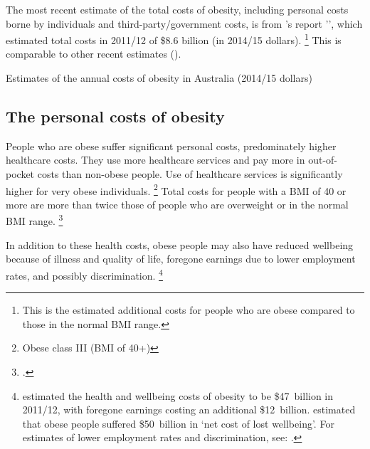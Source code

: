 \documentclass[embargoed]{grattan}
\begin{document}
The most recent estimate of the total costs of obesity, including personal costs borne by individuals and third-party/government costs, is from \citeauthor{PwC2015Weighingcostobesity}'s \citeyear{PwC2015Weighingcostobesity} report  '',
which estimated total costs in 2011/12 of \$8.6 billion (in 2014/15 dollars).%
\footnote{This is the estimated additional costs for people who are obese compared to those in the normal BMI range.} 
This is comparable to other recent estimates ().

\begin{table}
\caption{Estimates of the annual costs of obesity in Australia (2014/15 dollars)}\label{tbl:estimates-annual-costs-obesity-Australia}




\end{table}

\subsection{The personal costs of obesity }\label{the-personal-costs-of-obesity}

People who are obese suffer significant personal costs, predominately higher healthcare costs.
They use more healthcare services and pay more in out-of-pocket costs than non-obese people.
Use of healthcare services is significantly higher for very obese individuals.%
\footnote{Obese class III (BMI of 40+)} Total costs for people with a BMI of 40 or more are more than twice those of people who are overweight or in the normal BMI range.%
\footcites{PwC2015Weighingcostobesity}{Park2012impactchildhoodobesity}{Australia2014NoTimeWeight}

In addition to these health costs, obese people may also have reduced wellbeing because of illness and quality of life, foregone earnings due to lower employment rates, and possibly discrimination.%
\footnote{\textcite{PwC2015Weighingcostobesity} estimated the health and wellbeing costs of obesity to be \$47~billion in 2011/12, with foregone earnings costing an additional \$12~billion. \textcite{Economics2008growingcostobesity} estimated that obese people suffered \$50~billion in `net cost of lost wellbeing'.
For estimates of lower employment rates and discrimination, see: \textcites{Rooth2009Obesityattractivenessdifferential}{Boeckerman2016EffectWeightLabor}{Reichert2015Obesityweightloss}{Cawley2015economyscalesselective}.}
\end{document}
